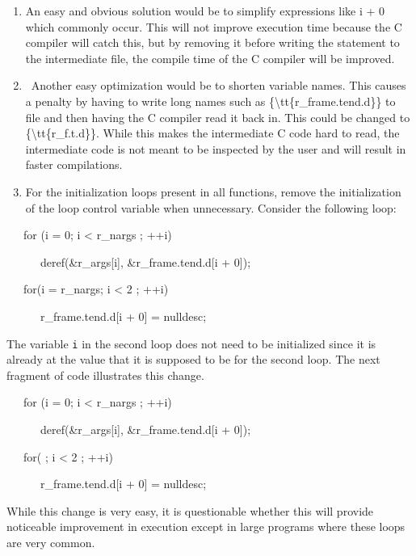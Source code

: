\liststyleLxxxviii
\begin{enumerate}

\item An easy and obvious solution would be to simplify expressions
like i + 0 which commonly occur. This will not improve execution time
because the C compiler will catch this, but by removing it before
writing the statement to the intermediate file, the compile time of
the C compiler will be improved.

\item \ Another easy optimization would be to shorten variable
names. This causes a penalty by having to write long names such as
\{{\textbackslash}tt\{r\_frame.tend.d\}\} to file and then having the
C compiler read it back in. This could be changed to
\{{\textbackslash}tt\{r\_f.t.d\}\}. While this makes the
intermediate C code hard to read, the intermediate code is not meant
to be inspected by the user and will result in faster compilations.

\item For the initialization loops present in all functions, remove
the initialization of the loop control variable when
unnecessary. Consider the following loop:
\end{enumerate}
{\ttfamily\mdseries
\ \ \ for (i = 0; i {\textless} r\_nargs ; ++i)}

{\ttfamily\mdseries
\ \ \ \ \ \ deref(\&r\_args[i], \&r\_frame.tend.d[i + 0]);}

{\ttfamily\mdseries
\ \ \ for(i = r\_nargs; i {\textless} 2 ; ++i)}

{\ttfamily\mdseries
\ \ \ \ \ \ r\_frame.tend.d[i + 0] = nulldesc;}


The variable \texttt{i} in the second loop does not need to be
initialized since it is already at the value that it is supposed to be
for the second loop. The next fragment of code illustrates this change.

{\ttfamily\mdseries
\ \ \ for (i = 0; i {\textless} r\_nargs ; ++i)}

{\ttfamily\mdseries
\ \ \ \ \ \ deref(\&r\_args[i], \&r\_frame.tend.d[i + 0]);}

{\ttfamily\mdseries
\ \ \ for( ; i {\textless} 2 ; ++i)}

{\ttfamily\mdseries
\ \ \ \ \ \ r\_frame.tend.d[i + 0] = nulldesc;}


While this change is very easy, it is questionable whether this will
provide noticeable improvement in execution except in large programs
where these loops are very common.

